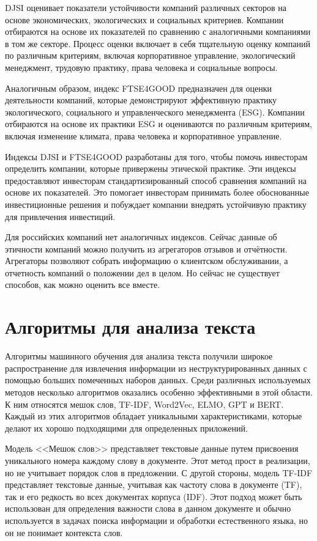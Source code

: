 \documentclass[PI, VKR]{HSEUniversity}
\begin{document}
DJSI оценивает показатели устойчивости компаний различных секторов на основе экономических, экологических и социальных критериев. Компании отбираются на основе их показателей по сравнению с аналогичными компаниями в том же секторе. Процесс оценки включает в себя тщательную оценку компаний по различным критериям, включая корпоративное управление, экологический менеджмент, трудовую практику, права человека и социальные вопросы.

Аналогичным образом, индекс FTSE4GOOD предназначен для оценки деятельности компаний, которые демонстрируют эффективную практику экологического, социального и управленческого менеджмента (ESG). Компании отбираются на основе их практики ESG и оцениваются по различным критериям, включая изменение климата, права человека и корпоративное управление.

Индексы DJSI и FTSE4GOOD разработаны для того, чтобы помочь инвесторам определить компании, которые привержены этической практике. Эти индексы предоставляют инвесторам стандартизированный способ сравнения компаний на основе их показателей. Это помогает инвесторам принимать более обоснованные инвестиционные решения и побуждает компании внедрять устойчивую практику для привлечения инвестиций.

Для российских компаний нет аналогичных индексов. Сейчас данные об этичности компаний можно получить из агрегаторов отзывов и отчётности. Агрегаторы позволяют собрать информацию о клиентском обслуживании, а отчетность компаний о положении дел в целом. Но сейчас не существует способов, как можно оценить все вместе.
\section{Алгоритмы для анализа текста}
\label{sec:org26b334a}
Алгоритмы машинного обучения для анализа текста получили широкое распространение для извлечения информации из неструктурированных данных с помощью больших помеченных наборов данных. Среди различных используемых методов несколько алгоритмов оказались особенно эффективными в этой области. К ним относятся мешок слов\autocite{harris_distributional_1954}, TF-IDF\autocite{jones_karen_sparck_statistical_1972}, Word2Vec\autocite{mikolov_distributed_2013}, ELMO\autocite{peters_deep_2018}, GPT\autocite{radford_language_2019} и BERT\autocite{devlin_bert_2019}. Каждый из этих алгоритмов обладает уникальными характеристиками, которые делают их хорошо подходящими для определенных приложений.

Модель {}<<Мешок слов>>{} представляет текстовые данные путем присвоения уникального номера каждому слову в документе. Этот метод прост в реализации, но не учитывает порядок слов в предложении. С другой стороны, модель TF-IDF представляет текстовые данные, учитывая как частоту слова в документе (TF), так и его редкость во всех документах корпуса (IDF). Этот подход может быть использован для определения важности слова в данном документе и обычно используется в задачах поиска информации и обработки естественного языка, но он не понимает контекста слов.
\end{document}
